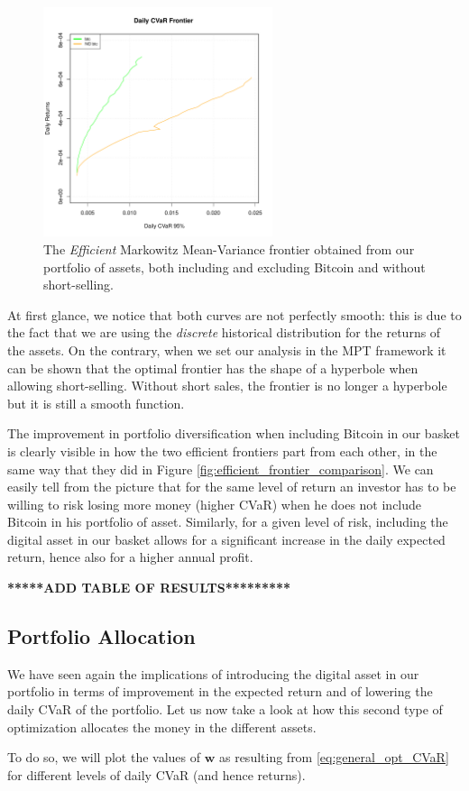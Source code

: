 \begin{figure}
	\centering
	\includegraphics[width=0.6\textwidth]{Images/efficient_frontier_CVaR.pdf}
	\caption{The \textit{Efficient} Markowitz Mean-Variance frontier obtained from our portfolio of assets, both including and excluding Bitcoin and without short-selling.}
	\label{fig:cvar_efficient_frontier_comparison}
\end{figure}


At first glance, we notice that both curves are not perfectly smooth: this is due to the fact that we are using the \textit{discrete} historical distribution for the returns of the assets. On the contrary, when we set our analysis in the MPT framework it can be shown that the optimal frontier has the shape of a hyperbole when allowing short-selling. Without short sales, the frontier is no longer a hyperbole but it is still a smooth function.

The improvement in portfolio diversification when including Bitcoin in our basket is clearly visible in how the two efficient frontiers part from each other, in the same way that they did in Figure \ref{fig:efficient_frontier_comparison}.
We can easily tell from the picture that for the same level of return an investor has to be willing to risk losing more money (higher CVaR) when he does not include Bitcoin in his portfolio of asset.
Similarly, for a given level of risk, including the digital asset in our basket allows for a significant increase in the daily expected return,  hence also for a higher annual profit.

\textbf{*****ADD TABLE OF RESULTS*********}

\subsection{Portfolio Allocation}
We have seen again the implications of introducing the digital asset in our portfolio in terms of improvement in the expected return and of lowering the daily CVaR of the portfolio.
Let us now take a look at how this second type of optimization allocates the money in the different assets.

To do so, we will plot the values of $\mathbf{w}$ as resulting from \eqref{eq:general_opt_CVaR} for different levels of daily CVaR (and hence returns).




